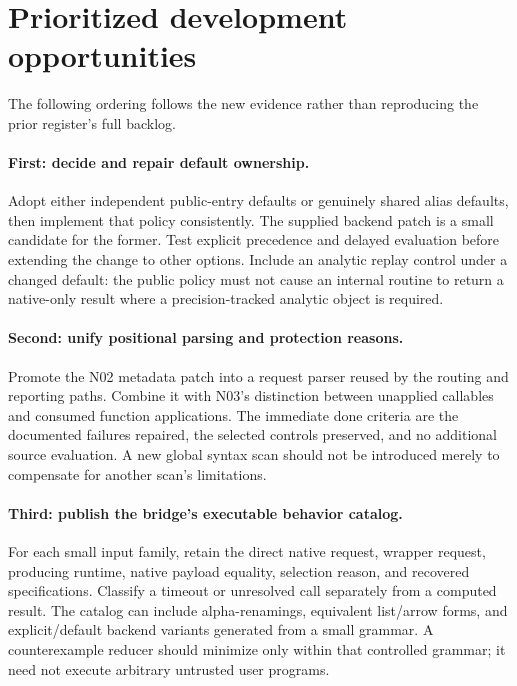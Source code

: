 \documentclass[11pt]{article}
\begin{document}
\section{Prioritized development opportunities}
\label{sec:roadmap}
The following ordering follows the new evidence rather than reproducing the prior register's full backlog.

\paragraph{First: decide and repair default ownership.}
Adopt either independent public-entry defaults or genuinely shared alias defaults, then implement that policy consistently. The supplied backend patch is a small candidate for the former. Test explicit precedence and delayed evaluation before extending the change to other options. Include an analytic replay control under a changed default: the public policy must not cause an internal routine to return a native-only result where a precision-tracked analytic object is required.

\paragraph{Second: unify positional parsing and protection reasons.}
Promote the N02 metadata patch into a request parser reused by the routing and reporting paths. Combine it with N03's distinction between unapplied callables and consumed function applications. The immediate done criteria are the documented failures repaired, the selected controls preserved, and no additional source evaluation. A new global syntax scan should not be introduced merely to compensate for another scan's limitations.

\paragraph{Third: publish the bridge's executable behavior catalog.}
For each small input family, retain the direct native request, wrapper request, producing runtime, native payload equality, selection reason, and recovered specifications. Classify a timeout or unresolved call separately from a computed result. The catalog can include alpha-renamings, equivalent list/arrow forms, and explicit/default backend variants generated from a small grammar. A counterexample reducer should minimize only within that controlled grammar; it need not execute arbitrary untrusted user programs.
\end{document}
